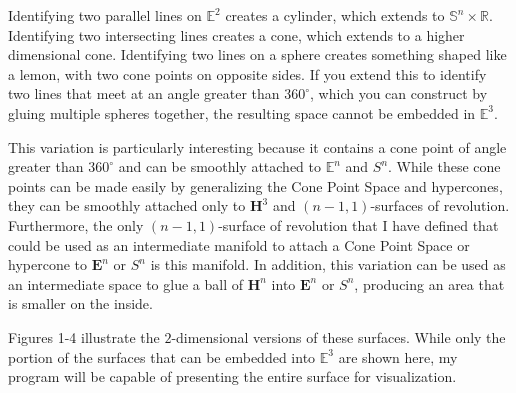 Identifying two parallel lines on $\mathbb{E}^2$ creates a cylinder, which extends to $\mathbb{S}^n \times \mathbb{R}$. Identifying two intersecting lines creates a cone, which extends to a higher dimensional cone. Identifying two lines on a sphere creates something shaped like a lemon, with two cone points on opposite sides. If you extend this to identify two lines that meet at an angle greater than $360^\circ$, which you can construct by gluing multiple spheres together, the resulting space cannot be embedded in $\mathbb{E}^3$.

This variation is particularly interesting because it contains a cone point of angle greater than $360^\circ$ and can be smoothly attached to $\mathbb{E}^n$ and $S^n$. While these cone points can be made easily by generalizing the Cone Point Space and hypercones, they can be smoothly attached only to $\textbf{H}^3$ and $(n-1,1)$-surfaces of revolution. Furthermore, the only $(n-1,1)$-surface of revolution that I have defined that could be used as an intermediate manifold to attach a Cone Point Space or hypercone to $\textbf{E}^n$ or $S^n$ is this manifold. In addition, this variation can be used as an intermediate space to glue a ball of $\textbf{H}^n$ into $\textbf{E}^n$ or $S^n$, producing an area that is smaller on the inside.

Figures 1-4 illustrate the $2$-dimensional versions of these surfaces. While only the portion of the surfaces that can be embedded into $\mathbb{E}^3$ are shown here, my program will be capable of presenting the entire surface for visualization.

